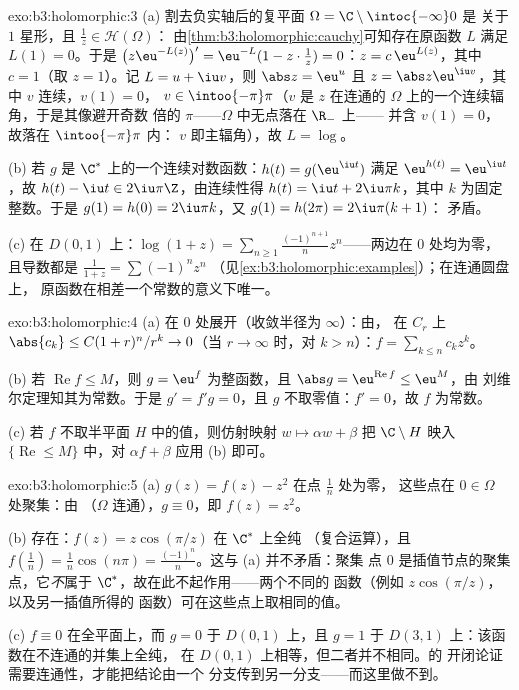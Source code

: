 \begin{solution}{exo:b3:holomorphic:3}
(a) 割去负实轴后的复平面 $\Omega = \C\setminus\intoc{-\infty}0$ 是
关于 $1$ 星形，且 $\frac1z \in \mathcal H(\Omega)$：
由\cref{thm:b3:holomorphic:cauchy}可知存在原函数 $L$
满足 $L(1) = 0$。于是 $\bigl(z\eu^{-L(z)}\bigr)' =
\eu^{-L}(1 - z\cdot\frac1z) = 0$：$z = c\,\eu^{L(z)}$，其中 $c
= 1$（取 $z = 1$）。记 $L = u + \iu v$，则 $\abs z = \eu^u$
且 $z = \abs z\eu^{\iu v}$，其中 $v$ 连续，$v(1) = 0$，
$v \in \intoo{-\pi}\pi$（$v$ 是 $z$
在连通的 $\Omega$ 上的一个连续辐角，于是其像避开奇数
倍的 $\pi$——$\Omega$ 中无点落在 $\R_-$ 上——
并含 $v(1) = 0$，故落在 $\intoo{-\pi}\pi$ 内：
$v$ 即主辐角），故 $L = \log$。

(b) 若 $g$ 是 $\C^*$ 上的一个连续对数函数：$h(t) =
g(\eu^{\iu t})$ 满足 $\eu^{h(t)} = \eu^{\iu t}$，故 $h(t)
- \iu t \in 2\iu\pi\Z$，由连续性得 $h(t) = \iu t +
2\iu\pi k$，其中 $k$ 为固定整数。于是 $g(1) = h(0) =
2\iu\pi k$，又 $g(1) = h(2\pi) = 2\iu\pi(k + 1)$：
矛盾。

(c) 在 $D(0,1)$ 上：$\log(1 + z) =
\sum_{n\geq1}\frac{(-1)^{n+1}}{n}z^n$——两边在
$0$ 处均为零，且导数都是 $\frac1{1+z} = \sum(-1)^nz^n$
（见\cref{ex:b3:holomorphic:examples}）；在连通圆盘上，
原函数在相差一个常数的意义下唯一。
\end{solution}

\begin{solution}{exo:b3:holomorphic:4}
(a) 在 $0$ 处展开（收敛半径为 $\infty$）：由，
在 $C_r$ 上 $\abs{c_k} \leq C(1 + r)^n/r^k \to 0$（当 $r \to
\infty$ 时，对 $k > n$）：$f = \sum_{k\leq n}c_kz^k$。

(b) 若 $\operatorname{Re}f \leq M$，则 $g = \eu^f$ 为整函数，且
$\abs g = \eu^{\operatorname{Re}f} \leq \eu^M$，由
刘维尔定理知其为常数。于是 $g' = f'g = 0$，且 $g$ 不取零值：$f' =
0$，故 $f$ 为常数。

(c) 若 $f$ 不取半平面 $H$ 中的值，则仿射映射 $w \mapsto
\alpha w + \beta$ 把 $\C\setminus H$ 映入
$\{\operatorname{Re} \leq M\}$ 中，对 $\alpha f +
\beta$ 应用 (b) 即可。
\end{solution}

\begin{solution}{exo:b3:holomorphic:5}
(a) $g(z) = f(z) - z^2$ 在点 $\frac1n$ 处为零，
这些点在 $0 \in \Omega$ 处聚集：由
（$\Omega$ 连通），$g \equiv 0$，即 $f(z) = z^2$。

(b) 存在：$f(z) = z\cos(\pi/z)$ 在 $\C^*$ 上全纯
（复合运算），且 $f(\frac1n) = \frac1n\cos(n\pi) =
\frac{(-1)^n}n$。这与 (a) 并不矛盾：聚集
点 $0$ 是插值节点的聚集点，它\emph{不}属于
$\C^*$，故在此不起作用——两个不同的
函数（例如 $z\cos(\pi/z)$，以及另一插值所得的
函数）可在这些点上取相同的值。

(c) $f \equiv 0$ 在全平面上，而 $g = 0$ 于 $D(0,1)$ 上，且
$g = 1$ 于 $D(3,1)$ 上：该函数在不连通的并集上全纯，
在 $D(0,1)$ 上相等，但二者并不相同。的
开闭论证需要连通性，才能把结论由一个
分支传到另一分支——而这里做不到。
\end{solution}

